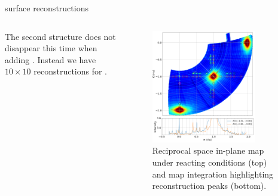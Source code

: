 \begin{frame}{\ptthreeofour surface reconstructions}
\begin{columns}


    The second structure does not disappear this time when adding \ammonia. Instead we have $10\times10$ reconstructions for \ptthreeofour.


    \begin{figure}
        \centering
        \includegraphics[width=0.79\textwidth]{Figures/sxrd_data/maps/band_in_k_reconstructions.png}
        \caption{Reciprocal space in-plane map under reacting conditions (top) and map integration highlighting reconstruction peaks (bottom).}
        \label{fig:CondE2}
    \end{figure}
    \end{columns}
    
\end{frame}